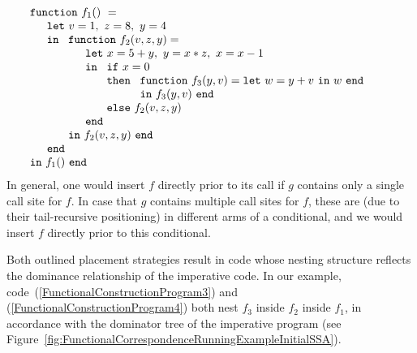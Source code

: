\begin{equation}
\label{FunctionalConstructionProgram4}
\begin{array}{l}
\texttt{function}\ f_1()\ = \\
  \quad
  \begin{array}{l}
     \texttt{let}\ v = 1, \ 
                   z = 8, \ 
                   y = 4\\
     \texttt{in}\ 
     \begin{array}[t]{l}
       \texttt{function}\ f_2(v,z,y) =\\
         \quad
         \begin{array}{l}
           \texttt{let}\ x = 5+y,\
                         y = x*z,\
                         x = x-1\\
           \texttt{in}\
             \begin{array}[t]{l}
               \texttt{if}\ x=0\\ 
               \texttt{then}\ 
                 \begin{array}[t]{l}
                   \texttt{function}\ f_3(y,v) = 
                   \texttt{let}\ w = y+v\ \texttt{in}\ w\ \texttt{end}\\
                   \texttt{in}\ f_3(y,v)\ \texttt{end}
                 \end{array}\\
               \texttt{else}\ f_2(v,z,y)
             \end{array}\\
           \texttt{end}
         \end{array}\\
     \texttt{in}\ f_2(v,z,y)\ \texttt{end}
     \end{array}\\
     \texttt{end}\\
   \end{array}\\
\texttt{in}\ f_1()\  \texttt{end}
\end{array}
\end{equation}
In general, one would insert $f$ directly prior to its call if $g$
contains only a single call site for $f$. In case that $g$ contains
multiple call sites for $f$, these are (due to their tail-recursive
positioning) in different arms of a conditional, and we would insert
$f$ directly prior to this conditional. 

Both outlined placement strategies result in code whose nesting
structure reflects the dominance relationship of the imperative code.
In our example, code~(\ref{FunctionalConstructionProgram3}) and
(\ref{FunctionalConstructionProgram4}) both nest $f_3$ inside $f_2$
inside $f_1$, in accordance with the dominator tree of the imperative
program (see
Figure~\ref{fig:FunctionalCorrespondenceRunningExampleInitialSSA}).

